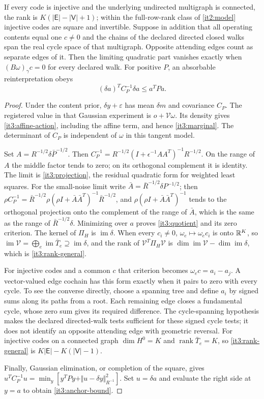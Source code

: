 If every code is injective and the underlying undirected multigraph is connected, the rank is $K(|\mathsf E|-|\mathsf V|+1)$; within the full-row-rank class of \cref{it2:model} injective codes are square and invertible. Suppose in addition that all operating contents equal one $c\ne0$ and the chains of the declared directed closed walks span the real cycle space of that multigraph. Opposite attending edges count as separate edges of it. Then the limiting quadratic part vanishes exactly when
$(B\omega)_\gamma c=0$ for every declared walk. For positive $P$, an absorbable reinterpretation obeys
\begin{equation}
(\delta a)^TC_P^{-1}\delta a\leq a^TPa.
\label{it3:anchor-bound}
\end{equation}
\begin{proof}
Under the content prior, $\delta y+\varepsilon$ has mean $\delta m$ and covariance $C_P$. The registered value in that Gaussian experiment is $o+\mathcal V\omega$. Its density gives \cref{it3:affine-action}, including the affine term, and hence \cref{it3:marginal}. The determinant of $C_P$ is independent of $\omega$ in this tangent model.

Set $A=R^{-1/2}\delta\bar P^{-1/2}$. Then
$C_P^{-1}=R^{-1/2}(I+\epsilon^{-1}AA^T)^{-1}R^{-1/2}$.
On the range of $A$ the middle factor tends to zero; on its orthogonal complement it is identity. The limit is \cref{it3:projection}, the residual quadratic form for weighted least squares. For the small-noise limit write $\bar A=\bar R^{-1/2}\delta P^{-1/2}$; then $\rho C_P^{-1}=\bar R^{-1/2}\rho(\rho I+\bar A\bar A^T)^{-1}\bar R^{-1/2}$, and $\rho(\rho I+\bar A\bar A^T)^{-1}$ tends to the orthogonal projection onto the complement of the range of $\bar A$, which is the same as the range of $\bar R^{-1/2}\delta$. Minimizing over $a$ proves \cref{it3:quotient} and its zero criterion. The kernel of $\Pi_H$ is $\operatorname{im}\delta$. When every $c_i\neq0$, $\omega_e\mapsto\omega_ec_i$ is onto $\mathbb R^K$, so $\operatorname{im}\mathcal V=\bigoplus_e\operatorname{im}\bar T_e\supseteq\operatorname{im}\delta$, and the rank of $\mathcal V^T\Pi_H\mathcal V$ is $\dim\operatorname{im}\mathcal V-\dim\operatorname{im}\delta$, which is \cref{it3:rank-general}.

For injective codes and a common $c$ that criterion becomes $\omega_ec=a_i-a_j$. A vector-valued edge cochain has this form exactly when it pairs to zero with every cycle. To see the converse directly, choose a spanning tree and define $a_i$ by signed sums along its paths from a root. Each remaining edge closes a fundamental cycle, whose zero sum gives its required difference. The cycle-spanning hypothesis makes the declared directed-walk tests sufficient for these signed cycle tests; it does not identify an opposite attending edge with geometric reversal. For injective codes on a connected graph $\dim H^0=K$ and $\operatorname{rank}\bar T_e=K$, so \cref{it3:rank-general} is $K|\mathsf E|-K(|\mathsf V|-1)$.

Finally, Gaussian elimination, or completion of the square, gives
$u^TC_P^{-1}u=\min_y[y^TPy+\Vert u-\delta y\Vert_{R^{-1}}^2]$.
Set $u=\delta a$ and evaluate the right side at $y=a$ to obtain \cref{it3:anchor-bound}.
\end{proof}


